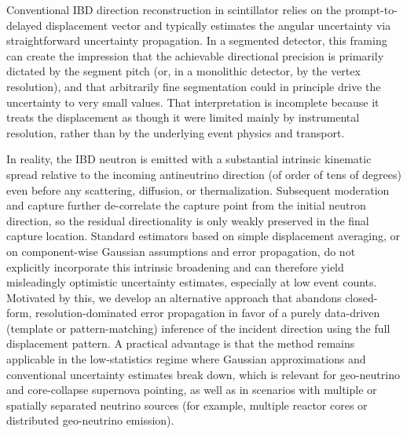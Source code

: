 \documentclass[tightenlines,twocolumn,prl,notitlepage,nofootinbib,preprintnumbers,longbibliography]{revtex4-1}
\begin{document}
\begin{table}
    \caption{Experiments with $^6$Li as a neutron-capture agent. Asterisk indicates proposed or prototype. For SANDD, the smallest segment size is listed. Solid, miniChandler, MAD-3D use sheets of LiZnS-based scintillator, the IBD ``target'' scintillator itself is not doped, so all the neutron captures are on the surfaces of the segments. ``L/P'' stands for Liquid or Plastic form. Active mass and $ N_{\mathrm{H}} $ are computed assuming PVT for plastic ($\rho$ = 1.032 g/cm$^{3}$, $ w_{\mathrm{H}} = 10/118 $), EJ-309-like DIPN for PROSPECT liquid ($\rho$ = 0.96 g/cm$^{3}$, $ w_{\mathrm{H}} = 20/212 $), LAB-like liquid for Bugey 3 ($\rho$ = 0.86 g/cm$^{3}$, $ w_{\mathrm{H}} = 0.121 $).} 
    \label{tab_Li6_detectors}
\end{table}

Conventional IBD direction reconstruction in scintillator relies on the prompt-to-delayed displacement vector and typically estimates the angular uncertainty via straightforward uncertainty propagation. In a segmented detector, this framing can create the impression that the achievable directional precision is primarily dictated by the segment pitch (or, in a monolithic detector, by the vertex resolution), and that arbitrarily fine segmentation could in principle drive the uncertainty to very small values. That interpretation is incomplete because it treats the displacement as though it were limited mainly by instrumental resolution, rather than by the underlying event physics and transport.

In reality, the IBD neutron is emitted with a substantial intrinsic kinematic spread relative to the incoming antineutrino direction (of order of tens of degrees) even before any scattering, diffusion, or thermalization. Subsequent moderation and capture further de-correlate the capture point from the initial neutron direction, so the residual directionality is only weakly preserved in the final capture location. Standard estimators based on simple displacement averaging, or on component-wise Gaussian assumptions and error propagation, do not explicitly incorporate this intrinsic broadening and can therefore yield misleadingly optimistic uncertainty estimates, especially at low event counts. Motivated by this, we develop an alternative approach that abandons closed-form, resolution-dominated error propagation in favor of a purely data-driven (template or pattern-matching) inference of the incident direction using the full displacement pattern. 
A practical advantage is that the method remains applicable in the low-statistics regime where Gaussian approximations and conventional uncertainty estimates break down, which is relevant for geo-neutrino and core-collapse supernova pointing, as well as in scenarios with multiple or spatially separated neutrino sources (for example, multiple reactor cores or distributed geo-neutrino emission).
\end{document}
